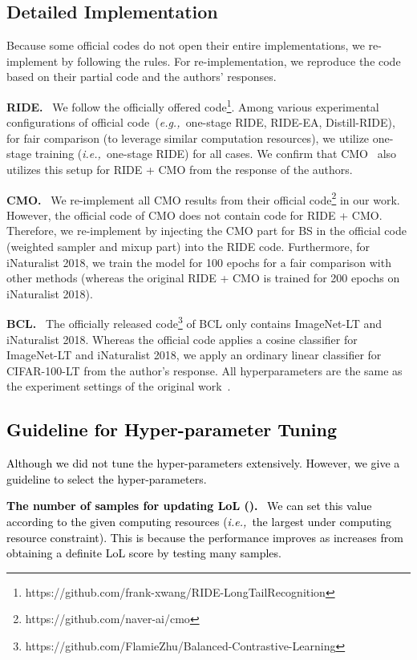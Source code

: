 \documentclass{article}
\newcommand{\eg}{\emph{e.g.,~}}
\newcommand{\ie}{\emph{i.e.,~}}
\newcommand{\myparagraph}[1]{\vspace{0.07cm}\noindent\textbf{#1}~}
\renewcommand*\cite[1]{\citep{#1}}
\newcommand{\rebut}[1]{\textcolor{black}{#1}}
\begin{document}
\subsection{Detailed Implementation}\label{app:implementation_issues}
Because some official codes do not open their entire implementations, we re-implement by following the rules. For re-implementation, we reproduce the code based on their partial code and the authors' responses.

\myparagraph{RIDE.} We follow the officially offered code\footnote{https://github.com/frank-xwang/RIDE-LongTailRecognition}. Among various experimental configurations of official code~(\eg one-stage RIDE, RIDE-EA, Distill-RIDE), for fair comparison (to leverage similar computation resources), we utilize one-stage training (\ie one-stage RIDE) for all cases. We confirm that CMO~\cite{park2022majority} also utilizes this setup for RIDE + CMO from the response of the authors.

\myparagraph{CMO.} We re-implement all CMO results from their official code\footnote{https://github.com/naver-ai/cmo} in our work. However, the official code of CMO does not contain code for RIDE + CMO. Therefore, we re-implement by injecting the CMO part for BS in the official code (weighted sampler and mixup part) into the RIDE code. Furthermore, for iNaturalist 2018, we train the model for 100 epochs for a fair comparison with other methods (whereas the original RIDE + CMO is trained for 200 epochs on iNaturalist 2018).

\myparagraph{BCL.} The officially released code\footnote{https://github.com/FlamieZhu/Balanced-Contrastive-Learning} of BCL only contains ImageNet-LT and iNaturalist 2018. Whereas the official code applies a cosine classifier for ImageNet-LT and iNaturalist 2018, we apply an ordinary linear classifier for CIFAR-100-LT from the author's response. All hyperparameters are the same as the experiment settings of the original work~\cite{zhu2022balanced}.

\subsection{\rebut{Guideline for Hyper-parameter Tuning}}
\rebut{Although we did not tune the hyper-parameters extensively. However, we give a guideline to select the hyper-parameters.}

\rebut{
\myparagraph{The number of samples for updating LoL ().} We can set this value according to the given computing resources (\ie the largest  under computing resource constraint). This is because the performance improves as  increases from obtaining a definite LoL score by testing many samples. 
}
\end{document}
